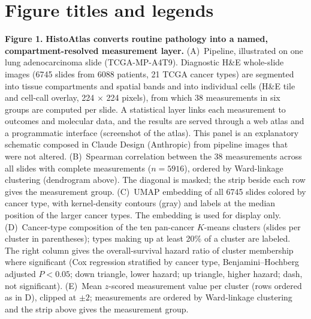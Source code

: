 \clearpage
\section*{Figure titles and legends}

\label{fig:fig1}
\noindent\textbf{Figure 1.} \textbf{HistoAtlas converts routine pathology into a named, 
compartment-resolved measurement layer.} 
(A)~Pipeline, illustrated on one lung adenocarcinoma slide (TCGA-MP-A4T9). 
Diagnostic H\&E whole-slide images (\num{6745} slides from \num{6088} patients, 
21 TCGA cancer types) are segmented into tissue compartments and spatial bands 
and into individual cells (H\&E tile and cell-call overlay, 224 $\times$ 224 
pixels), from which 38 measurements in six groups are computed per slide. A 
statistical layer links each measurement to outcomes and molecular data, and 
the results are served through a web atlas and a programmatic interface 
(screenshot of the atlas). This panel is an explanatory schematic composed in 
Claude Design (Anthropic) from pipeline images that were not altered. 
(B)~Spearman correlation between the 38 measurements across all slides with 
complete measurements ($n = \num{5916}$), ordered by Ward-linkage clustering 
(dendrogram above). The diagonal is masked; the strip beside each row gives the 
measurement group. 
(C)~UMAP embedding of all \num{6745} slides colored by cancer type, with 
kernel-density contours (gray) and labels at the median position of the larger 
cancer types. The embedding is used for display only. 
(D)~Cancer-type composition of the ten pan-cancer $K$-means clusters (slides per 
cluster in parentheses); types making up at least 20\% of a cluster are labeled. 
The right column gives the overall-survival hazard ratio of cluster membership 
where significant (Cox regression stratified by cancer type, 
Benjamini--Hochberg adjusted $P < 0.05$; down triangle, lower hazard; up 
triangle, higher hazard; dash, not significant). 
(E)~Mean $z$-scored measurement value per cluster (rows ordered as in D), 
clipped at $\pm 2$; measurements are ordered by Ward-linkage clustering and the 
strip above gives the measurement group.
\par\medskip

